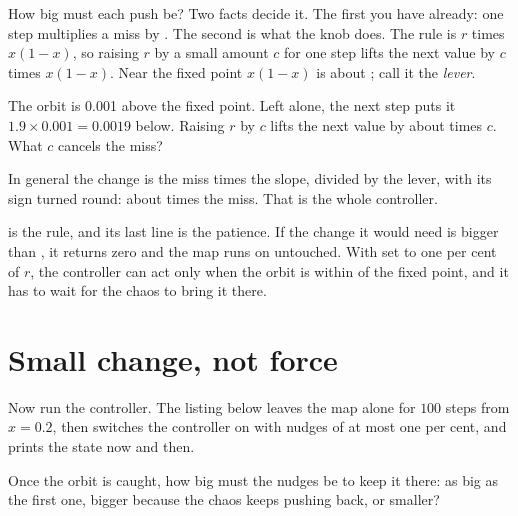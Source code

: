 \noindent
How big must each push be? Two facts decide it. The first you have already:
one step multiplies a miss by . The second is what the knob
does. The rule is $r$ times $x(1 - x)$, so raising $r$ by a small amount $c$
for one step lifts the next value by $c$ times $x(1 - x)$. Near the fixed
point $x(1 - x)$ is about ; call it the \emph{lever}.

\begin{think}
The orbit is \num{0.001} above the fixed point. Left alone, the next step puts
it $\num{1.9} \times \num{0.001} = \num{0.0019}$ below. Raising $r$ by $c$
lifts the next value by about  times $c$. What $c$ cancels the
miss?
\end{think}
In general the change is the miss times the slope, divided by the lever, with
its sign turned round: about  times the miss. That is the whole
controller.


\noindent
{} is the rule, and its last line is the patience. If the change it
would need is bigger than , it returns zero and the map runs on
untouched. With  set to one per cent of $r$, the controller can
act only when the orbit is within  of the fixed point, and it
has to wait for the chaos to bring it there.


\section{Small change, not force}
\label{sec:ch17-small}

\noindent
Now run the controller. The listing below leaves the map alone for $100$ steps from
$x = \num{0.2}$, then switches the controller on with nudges of at most one
per cent, and prints the state now and then.

\begin{think}
Once the orbit is caught, how big must the nudges be to keep it there: as big
as the first one, bigger because the chaos keeps pushing back, or smaller?
\end{think}

